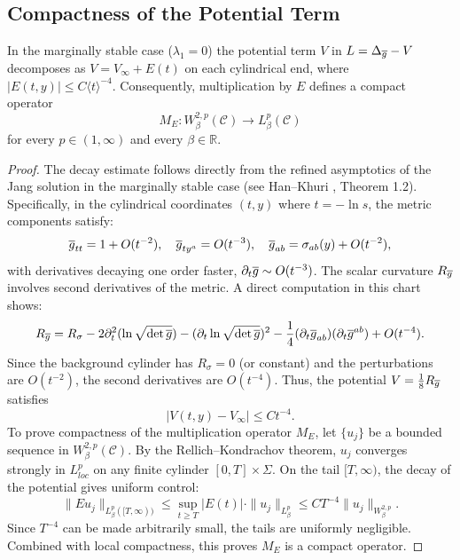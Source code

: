 \subsection{Compactness of the Potential Term}

\begin{lemma}\label{lem:PotentialDecay}
In the marginally stable case ($\lambda_1=0$) the potential term $V$ in $L = \Delta_{\overline{g}} - V$ decomposes as $V = V_\infty + E(t)$ on each cylindrical end, where $|E(t,y)| \le C\langle t \rangle^{-4}$.  Consequently, multiplication by $E$ defines a compact operator
\[
    M_E : W^{2,p}_{\beta}(\mathcal{C}) \longrightarrow L^{p}_{\beta}(\mathcal{C})
\]
for every $p \in (1,\infty)$ and every $\beta \in \mathbb{R}$.
\end{lemma}

\begin{proof}
The decay estimate follows directly from the refined asymptotics of the Jang solution in the marginally stable case (see Han--Khuri \cite{hankhuri2013}, Theorem 1.2). Specifically, in the cylindrical coordinates $(t,y)$ where $t = -\ln s$, the metric components satisfy:
\[
    \overline{g}_{tt} = 1 + O(t^{-2}), \quad \overline{g}_{ty^a} = O(t^{-3}), \quad \overline{g}_{ab} = \sigma_{ab}(y) + O(t^{-2}),
\]
with derivatives decaying one order faster, $\partial_t \overline{g} \sim O(t^{-3})$.
The scalar curvature $R_{\overline{g}}$ involves second derivatives of the metric. A direct computation in this chart shows:
\[
    R_{\overline{g}} = R_{\sigma} - 2\partial_t^2 (\ln \sqrt{\det \overline{g}}) - (\partial_t \ln \sqrt{\det \overline{g}})^2 - \frac{1}{4}(\partial_t \overline{g}_{ab})(\partial_t \overline{g}^{ab}) + O(t^{-4}).
\]
Since the background cylinder has $R_{\sigma} = 0$ (or constant) and the perturbations are $O(t^{-2})$, the second derivatives are $O(t^{-4})$. Thus, the potential $V = \frac{1}{8}R_{\overline{g}}$ satisfies
\[
    |V(t,y) - V_\infty| \le C t^{-4}.
\]
To prove compactness of the multiplication operator $M_E$, let $\{u_j\}$ be a bounded sequence in $W^{2,p}_\beta(\mathcal{C})$. By the Rellich--Kondrachov theorem, $u_j$ converges strongly in $L^p_{loc}$ on any finite cylinder $[0,T]\times \Sigma$. On the tail $[T,\infty)$, the decay of the potential gives uniform control:
\[
    \|E u_j\|_{L^p_\beta([T,\infty))} \le \sup_{t\ge T} |E(t)| \cdot \|u_j\|_{L^p_\beta} \le C T^{-4} \|u_j\|_{W^{2,p}_\beta}.
\]
Since $T^{-4}$ can be made arbitrarily small, the tails are uniformly negligible. Combined with local compactness, this proves $M_E$ is a compact operator.
\end{proof}

